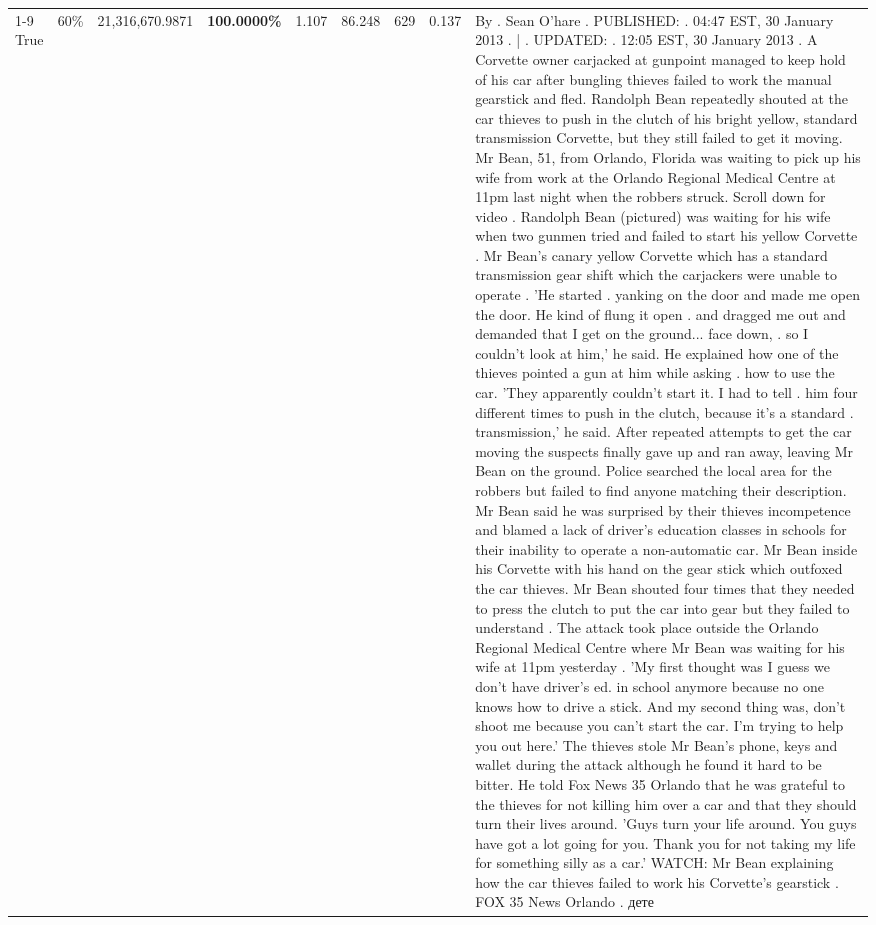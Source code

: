 \begin{table}[H]
\begin{tabular}{lllrlllll}
\cline{1-9} \cline{2-9}
True & 60\% & 21,316,670.9871 & \bfseries \color{red} 100.0000\% & 1.107 & 86.248 & 629 & 0.137 & By . Sean O'hare . PUBLISHED: . 04:47 EST, 30 January 2013 . | . UPDATED: . 12:05 EST, 30 January 2013 . A Corvette owner carjacked at gunpoint managed to keep hold of his car after bungling thieves failed to work the manual gearstick and fled. Randolph Bean repeatedly shouted at the car thieves to push in the clutch of his bright yellow, standard transmission Corvette, but they still failed to get it moving. Mr Bean, 51, from Orlando, Florida was waiting to pick up his wife from work at the Orlando Regional Medical Centre at 11pm last night when the robbers struck. Scroll down for video . Randolph Bean (pictured) was waiting for his wife when two gunmen tried and failed to start his yellow Corvette . Mr Bean's canary yellow Corvette which has a standard transmission gear shift which the carjackers were unable to operate . 'He started . yanking on the door and made me open the door. He kind of flung it open . and dragged me out and demanded that I get on the ground... face down, . so I couldn't look at him,' he said. He explained how one of the thieves pointed a gun at him while asking . how to use the car. 'They apparently couldn't start it. I had to tell . him four different times to push in the clutch, because it's a standard . transmission,' he said. After repeated attempts to get the car moving the suspects finally gave up and ran away, leaving Mr Bean on the ground. Police searched the local area for the robbers but failed to find anyone matching their description. Mr Bean said he was surprised by their thieves incompetence and blamed a lack of driver's education classes in schools for their inability to operate a non-automatic car. Mr Bean inside his Corvette with his hand on the gear stick which outfoxed the car thieves. Mr Bean shouted four times that they needed to press the clutch to put the car into gear but they failed to understand . The attack took place outside the Orlando Regional Medical Centre where Mr Bean was waiting for his wife at 11pm yesterday . 'My first thought was I guess we don't have driver's ed. in school anymore because no one knows how to drive a stick. And my second thing was, don't shoot me because you can't start the car. I'm trying to help you out here.' The thieves stole Mr Bean's phone, keys and wallet during the attack although he found it hard to be bitter. He told Fox News 35 Orlando that he was grateful to the thieves for not killing him over a car and that they should turn their lives around. 'Guys turn your life around. You guys have got a lot going for you. Thank you for not taking my life for something silly as a car.' WATCH: Mr Bean explaining how the car thieves failed to work his Corvette's gearstick . FOX 35 News Orlando . дете \\

\end{tabular}
\end{table}
